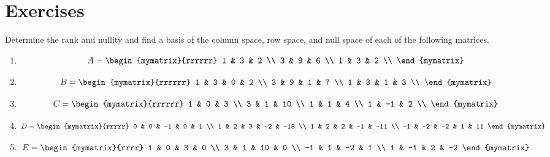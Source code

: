 \section*{Exercises}


\begin{ex}
  Determine the rank and nullity and find a basis of the column
  space, row space, and null space of each of the following matrices.
  \begin{enumerate}
  \item
    \begin{equation*}
      A = \begin{mymatrix}{rrrrrr}
        1 & 3 & 2 \\ 
        3 & 9 & 6 \\ 
        1 & 3 & 2 \\
      \end{mymatrix} 
    \end{equation*}
  \item
    \begin{equation*}
      B = \begin{mymatrix}{rrrrrr}
        1 & 3 & 0 & 2 \\
        3 & 9 & 1 & 7 \\
        1 & 3 & 1 & 3 \\
      \end{mymatrix} 
    \end{equation*}
  \item
    \begin{equation*}
      C = \begin{mymatrix}{rrrrrr}
        1 & 0 & 3 \\
        3 & 1 & 10 \\
        1 & 1 & 4 \\
        1 & -1 & 2 \\
      \end{mymatrix}
    \end{equation*}
  \item
    \begin{equation*}
      D = \begin{mymatrix}{rrrrr}
        0 & 0 & -1 & 0 & 1 \\ 
        1 & 2 & 3 & -2 & -18 \\ 
        1 & 2 & 2 & -1 & -11 \\ 
        -1 & -2 & -2 & 1 & 11
      \end{mymatrix}
    \end{equation*}
  \item
    \begin{equation*}
      E = \begin{mymatrix}{rrrr}
        1 & 0 & 3 & 0 \\ 
        3 & 1 & 10 & 0 \\ 
        -1 & 1 & -2 & 1 \\ 
        1 & -1 & 2 & -2
      \end{mymatrix}
    \end{equation*}
  \end{enumerate}
\end{ex}

